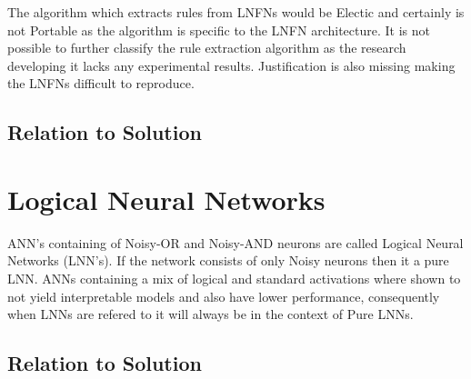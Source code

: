 The algorithm which extracts rules from LNFNs would be Electic and certainly is not Portable as the algorithm is specific to the LNFN architecture. It is not possible to further classify the rule extraction algorithm as the research developing it lacks any experimental results. Justification is also missing making the LNFNs difficult to reproduce.\\

\subsection{Relation to Solution}

\section{Logical Neural Networks}
ANN's containing of Noisy-OR and Noisy-AND neurons are called Logical Neural Networks \cite{LearningLogicalActivations} (LNN's). If the network consists of only Noisy neurons then it a pure LNN. ANNs containing a mix of logical and standard activations where shown to not yield interpretable models and also have lower performance, consequently when LNNs are refered to it will always be in the context of Pure LNNs.

\subsection{Relation to Solution}

